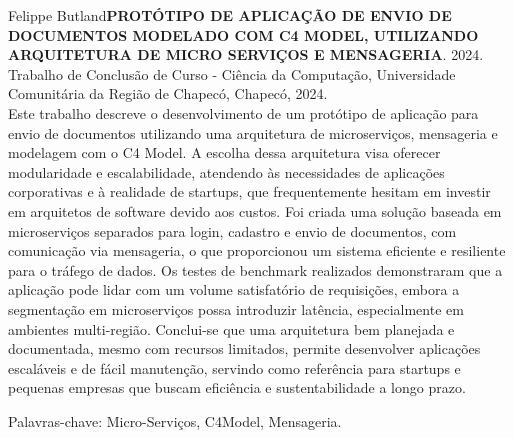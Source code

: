 \setlength{\absparsep}{18pt} %
\begin{resumo}
\noindent Felippe Butland\textbf{PROTÓTIPO DE APLICAÇÃO DE ENVIO DE DOCUMENTOS MODELADO COM C4
MODEL, UTILIZANDO ARQUITETURA DE MICRO SERVIÇOS E MENSAGERIA}. 2024. Trabalho de Conclusão de Curso - Ciência da Computação, Universidade Comunitária da Região de Chapecó, Chapecó, 2024.\\


\noindent  Este trabalho descreve o desenvolvimento de um protótipo de aplicação para envio de documentos utilizando uma arquitetura de microserviços, mensageria e modelagem com o C4 Model. A escolha dessa arquitetura visa oferecer modularidade e escalabilidade, atendendo às necessidades de aplicações corporativas e à realidade de startups, que frequentemente hesitam em investir em arquitetos de software devido aos custos. Foi criada uma solução baseada em microserviços separados para login, cadastro e envio de documentos, com comunicação via mensageria, o que proporcionou um sistema eficiente e resiliente para o tráfego de dados.  Os testes de benchmark realizados demonstraram que a aplicação pode lidar com um volume satisfatório de requisições, embora a segmentação em microserviços possa introduzir latência, especialmente em ambientes multi-região. Conclui-se que uma arquitetura bem planejada e documentada, mesmo com recursos limitados, permite desenvolver aplicações escaláveis e de fácil manutenção, servindo como referência para startups e pequenas empresas que buscam eficiência e sustentabilidade a longo prazo.

\noindent Palavras-chave: Micro-Serviços, C4Model, Mensageria.
\end{resumo}